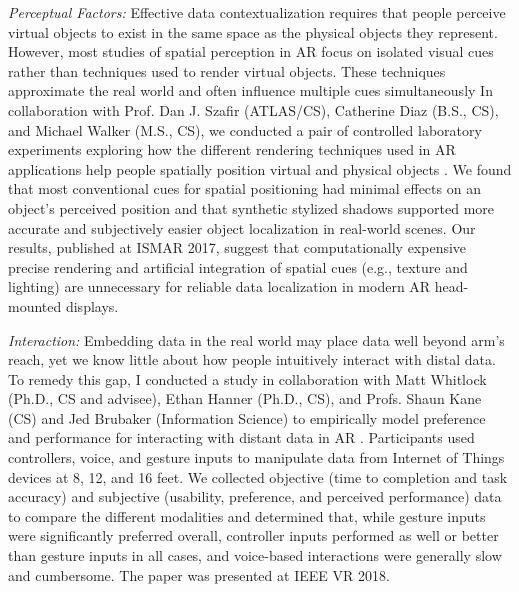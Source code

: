 \documentclass[11pt]{article}
\begin{document}
\emph{Perceptual Factors: }Effective data contextualization requires that people perceive virtual objects to exist in the same space as the physical objects they represent. However, most studies of spatial perception in AR focus on isolated visual cues rather than techniques used to render virtual objects. These techniques approximate the real world and often influence multiple cues simultaneously 
In collaboration with Prof. Dan J. Szafir (ATLAS/CS), Catherine Diaz (B.S., CS), and Michael Walker (M.S., CS), we conducted a pair of controlled laboratory experiments exploring how the different rendering techniques used in AR applications 
help people spatially position virtual and physical objects
\cite{diaz2017designing}.  
We found that most conventional cues for spatial positioning had minimal effects on an object's perceived position and that synthetic stylized shadows supported more accurate and subjectively easier object localization in real-world scenes. Our results, published at ISMAR 2017,
 suggest that computationally expensive precise rendering and artificial integration of spatial cues (e.g., texture and lighting) are unnecessary for reliable data localization in modern AR head-mounted displays. 
 
\emph{Interaction: }Embedding data in the real world may place data well beyond arm's reach, yet we know little about how people intuitively interact with distal data.
To remedy this gap, I conducted a study in collaboration with Matt Whitlock (Ph.D., CS and advisee), Ethan Hanner (Ph.D., CS), and Profs. Shaun Kane (CS) and Jed Brubaker (Information Science) to empirically model preference and performance for interacting with distant data in AR \cite{whitlock2018Distal}. Participants used controllers, voice, and gesture inputs to manipulate data from Internet of Things devices at 8, 12, and 16 feet. We collected objective (time to completion and task accuracy) and subjective (usability, preference, and perceived performance) data to compare the different modalities and determined that, while gesture inputs were significantly preferred overall, controller inputs performed as well or better than gesture inputs in all cases, and voice-based interactions were generally slow and cumbersome. The paper was presented at IEEE VR 2018. 
\end{document}
